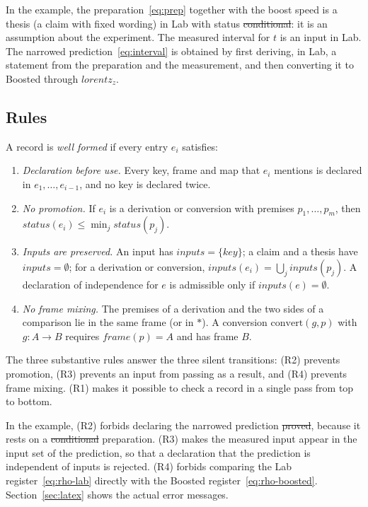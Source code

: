 In the example, the preparation~\eqref{eq:prep} together with the boost speed is a thesis (a claim with fixed wording) in Lab with status \st{conditional}: it is an
assumption about the experiment. The measured interval for $t$ is an input in Lab. The narrowed prediction~\eqref{eq:interval} is
obtained by first deriving, in Lab, a statement from the preparation and the measurement, and then converting it to Boosted through
$\mathit{lorentz}_z$.

\subsection{Rules}

\begin{definition}\label{def:rules}
A record is \emph{well formed} if every entry $e_i$ satisfies:
\begin{enumerate}[nosep,label=(R\arabic*),leftmargin=2.5em]
\item \emph{Declaration before use.} Every key, frame and map that $e_i$ mentions is declared in $e_1,\dots,e_{i-1}$, and no key is
declared twice.
\item \emph{No promotion.} If $e_i$ is a derivation or conversion with premises $p_1,\dots,p_m$, then
$\mathit{status}(e_i)\le\min_j\mathit{status}(p_j)$.
\item \emph{Inputs are preserved.} An input has $\mathit{inputs}=\{\mathit{key}\}$; a claim and a thesis have
$\mathit{inputs}=\emptyset$; for a derivation or conversion, $\mathit{inputs}(e_i)=\bigcup_j\mathit{inputs}(p_j)$. A declaration of
independence for $e$ is admissible only if $\mathit{inputs}(e)=\emptyset$.
\item \emph{No frame mixing.} The premises of a derivation and the two sides of a comparison lie in the same frame (or in $*$). A
conversion $\mathrm{convert}(g,p)$ with $g\colon A\to B$ requires $\mathit{frame}(p)=A$ and has frame $B$.
\end{enumerate}
\end{definition}

The three substantive rules answer the three silent transitions: (R2) prevents promotion, (R3) prevents an input from passing as a
result, and (R4) prevents frame mixing. (R1) makes it possible to check a record in a single pass from top to bottom.

In the example, (R2) forbids declaring the narrowed prediction \st{proved}, because it rests on a \st{conditional} preparation. (R3)
makes the measured input appear in the input set of the prediction, so that a declaration that the prediction is independent of
inputs is rejected. (R4) forbids comparing the Lab register~\eqref{eq:rho-lab} directly with the Boosted register~\eqref{eq:rho-boosted}.
Section~\ref{sec:latex} shows the actual error messages.

